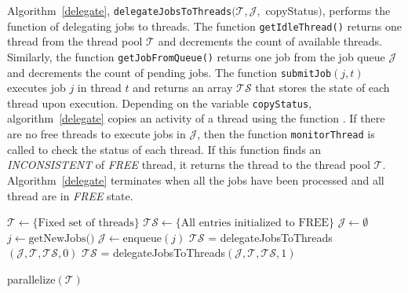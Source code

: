 \documentclass{article}
\begin{document}
{Algorithm~\ref{delegate}, \texttt{delegateJobsToThreads}$(\mathcal{T}, \mathcal{J},$ copyStatus$)$, 
performs the function of delegating jobs to threads. The function \texttt{getIdleThread()} returns  
one thread from the thread pool $\mathcal{T}$ and decrements the count of available threads. 
Similarly, the function \texttt{getJobFromQueue()} returns one job from the job queue $\mathcal{J}$ 
and decrements the count of pending jobs. The function \texttt{submitJob$(j,t)$} executes job $j$ 
in thread $t$ and returns an array $\mathcal{TS}$ that stores the state of each thread upon execution. 
Depending on the variable \texttt{copyStatus}, algorithm~\ref{delegate} copies an activity of a 
thread using the function .  If there are no free threads to execute jobs 
in $\mathcal{J}$, then the function \texttt{monitorThread} is called to check the status of each thread. 
If this function finds an \emph{INCONSISTENT} of \emph{FREE} thread, it returns the thread to the thread 
pool $\mathcal{T}$.  Algorithm~\ref{delegate} terminates when all the jobs have been processed and all 
thread are in \emph{FREE} state. 
%
%
%
\begin{algorithm2e}[t]
\DontPrintSemicolon
{}
\begin{small}
	$\mathcal{T} \leftarrow \{\text{Fixed set of threads}\}$ \;
	$\mathcal{TS} \leftarrow \{\text{All entries initialized to FREE}\}$ \;
	$\mathcal{J} \leftarrow \emptyset$ \;
	 {
	  $j \leftarrow \text{getNewJobs()}$ \;
	  $\mathcal{J} \leftarrow \text{enqueue}(j)$ \;
	  {
		  $\mathcal{TS}$ = delegateJobsToThreads$(\mathcal{J}, \mathcal{T}, \mathcal{TS}, 0)$ \;
	  }
	  \Else 
	  {
		  $\mathcal{TS}$ = delegateJobsToThreads$(\mathcal{J}, \mathcal{T}, \mathcal{TS}, 1)$ \;
	  }
        }
           \continue
	\return \;
\end{small}
	\caption{parallelize$(\mathcal{T})$
}
\end{algorithm2e}}
\end{document}
